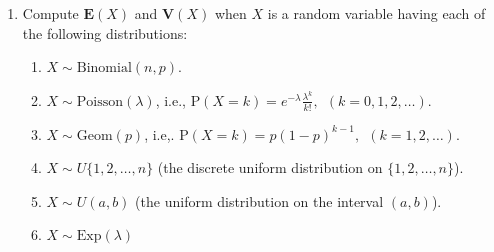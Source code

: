 \documentclass[11pt]{report}
\theoremstyle{plain}
\theoremstyle{definition}
\begin{document}
\begin{enumerate}[label=\arabic*.]
$\textbf{Hint.}$ for each $n\ge 1$, let $\pi_n$ be
the random permutation of $(1,2,\ldots,n)$ obtained
by forgetting the values of $(X_1,\ldots,X_n)$ and
only retaining their respective order. In other words,
define

\[
\pi_n(k) = \#\{1\le j\le n : X_j \le X_k\}.
\]

By considering the joint density $f_{X_1,\ldots,X_n}$
(a uniform density on the $n$-dimensional unit cube),
show that $\pi_n$ is a uniformly random permutation
of $n$ elements, i.e.
$\mathrm{P}(\pi_n = \sigma) = 1/n!$ for any
permutation $\sigma \in S_n$. Deduce that the event
$A_n = \{\pi_n(n)=n\}$ is independent of $\pi_{n-1}$
and therefore is independent of the previous events
$(A_1,\ldots,A_{n-1})$, which are all determined by
$\pi_{n-1}$.

(b) Define

\[
R_n = \sum_{k=1}^n 1_{A_k} = \#\{ 1\le k\le n: k\textrm{ is a record time} \}, \qquad (n=1,2,\ldots).
\]

Compute $\mathbf{E}(R_n)$ and $\mathbf{V}(R_n)$.
Deduce that if $(m_n)_{n=1}^\infty$ is a sequence of
positive numbers such that $m_n \uparrow \infty$,
however slowly, then the number $R_n$ of record times
up to time $n$ satisfies

\[
\mathrm{P}\left(|R_n - \log n|>m_n \sqrt{\log n}\right) \xrightarrow[n\to\infty]{} 0.
\]

\item Compute $\mathbf{E}(X)$ and $\mathbf{V}(X)$ when $X$
is a random variable having each of the following
distributions:

\begin{enumerate}[label=\arabic*.]
\item $X \sim \textrm{Binomial}(n,p)$.

\item $X \sim \textrm{Poisson}(\lambda)$, i.e.,
$\mathrm{P}(X=k)=e^{-\lambda} \frac{\lambda^k}{k!}, \
\ (k=0,1,2,\ldots)$.

\item $X \sim \textrm{Geom}(p)$, i.e,.
$\mathrm{P}(X=k)=p(1-p)^{k-1}, \ \ (k=1,2,\ldots)$.

\item $X \sim U\{1,2,\ldots,n\}$ (the discrete uniform
distribution on $\{1,2,\ldots,n\}$).

\item $X \sim U(a,b)$ (the uniform distribution on the
interval $(a,b)$).

\item $X \sim \textrm{Exp}(\lambda)$
\end{enumerate}


\end{enumerate}
\end{document}
